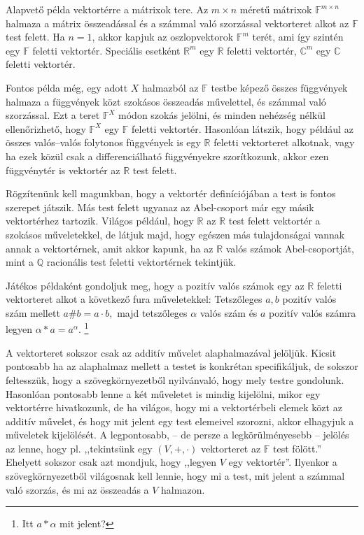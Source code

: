 \documentclass[9pt, a4paper, showtrims]{memoir}
\theoremstyle{plain}
\theoremstyle{remark}
\theoremstyle{definition}
\begin{document}
Alapvető példa vektortérre a mátrixok tere.
Az $m\times n$ méretű mátrixok $\mathbb{F}^{m\times n}$ halmaza a mátrix összeadással és a számmal való szorzással
vektorteret alkot az $\mathbb{F}$ test felett.
Ha $n=1$, akkor kapjuk az oszlopvektorok $\mathbb{F}^m$ terét, ami így szintén egy $\mathbb{F}$ feletti vektortér.
Speciális esetként $\mathbb{R}^m$ egy $\mathbb{R}$ feletti vektortér,
$\mathbb{C}^m$ egy $\mathbb{C}$ feletti vektortér.

Fontos példa még, egy adott $X$ halmazból az $\mathbb{F}$ testbe képező összes függvények halmaza
a függvények közt szokásos összeadás művelettel, és számmal való szorzással.
Ezt a teret $\mathbb{F}^X$ módon szokás jelölni, és minden nehézség nélkül ellenőrizhető,
hogy $\mathbb{F}^X$ egy $\mathbb{F}$ feletti vektortér.
Hasonlóan látszik, hogy például az összes valós--valós folytonos függvények is egy $\mathbb{R}$
feletti vektorteret alkotnak, vagy ha ezek közül csak a differenciálható függvényekre szorítkozunk,
akkor ezen függvénytér is vektortér az $\mathbb{R}$ test felett.

Rögzítenünk kell magunkban, hogy a vektortér definíciójában a test is fontos szerepet játszik.
Más test felett ugyanaz az Abel-csoport már egy másik vektortérhez tartozik.
Világos például, hogy $\mathbb{R}$ az $\mathbb{R}$ test felett vektortér a szokásos műveletekkel,
de látjuk majd, hogy egészen más tulajdonságai vannak annak a vektortérnek,
amit akkor kapunk,
ha az $\mathbb{R}$ valós számok Abel-csoportját,
mint a $\mathbb{Q}$ racionális test feletti vektortérnek tekintjük.

Játékos példaként gondoljuk meg,
hogy a pozitív valós számok egy az $\mathbb{R}$ feletti vektorteret alkot a következő fura műveletekkel:
Tetszőleges $a,b$ pozitív valós szám mellett
\(
a\#b=a\cdot b,
\)
majd tetszőleges $\alpha$ valós szám és $a$ pozitív valós számra legyen
\(
\alpha\ast a=a^\alpha.
\)
\footnote{Itt $a\ast\alpha$ mit jelent?}

A vektorteret sokszor csak az additív művelet alaphalmazával jelöljük.
Kicsit pontosabb ha az alaphalmaz mellett a testet is konkrétan specifikáljuk,
de sokszor feltesszük, hogy a szövegkörnyezetből nyilvánvaló, hogy mely testre gondolunk.
Hasonlóan pontosabb lenne a két műveletet is mindig kijelölni, mikor egy vektortérre hivatkozunk,
de ha világos, hogy mi a vektortérbeli elemek közt az additív művelet, és hogy mit jelent egy test elemeivel szorozni,
akkor elhagyjuk a műveletek kijelölését.
A legpontosabb, -- de persze a legkörülményesebb -- jelölés az lenne, hogy pl.
,,tekintsünk egy $\left( V,+,\cdot \right)$ vektorteret az $\mathbb{F}$ test fölött.''
Ehelyett sokszor csak azt mondjuk, hogy
,,legyen $V$ egy vektortér''.
Ilyenkor a szövegkörnyezetből világosnak kell lennie, hogy mi a test, mit jelent a számmal való szorzás, és mi az összeadás a $V$ halmazon.
\end{document}
